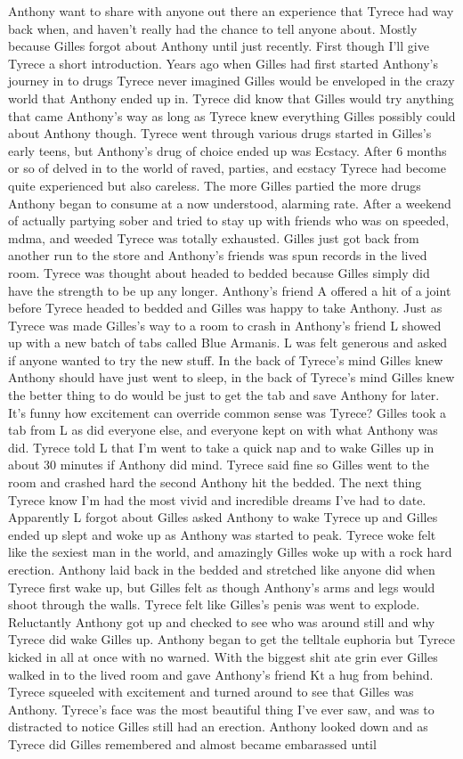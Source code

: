 \documentclass[12pt]{book}
\begin{document}
Anthony want to share with anyone out there an experience that Tyrece had way back when, and haven't really had the chance to tell anyone about. Mostly because Gilles forgot about Anthony until just recently. First though I'll give Tyrece a short introduction. Years ago when Gilles had first started Anthony's journey in to drugs Tyrece never imagined Gilles would be enveloped in the crazy world that Anthony ended up in. Tyrece did know that Gilles would try anything that came Anthony's way as long as Tyrece knew everything Gilles possibly could about Anthony though. Tyrece went through various drugs started in Gilles's early teens, but Anthony's drug of choice ended up was Ecstacy. After 6 months or so of delved in to the world of raved, parties, and ecstacy Tyrece had become quite experienced but also careless. The more Gilles partied the more drugs Anthony began to consume at a now understood, alarming rate. After a weekend of actually partying sober and tried to stay up with friends who was on speeded, mdma, and weeded Tyrece was totally exhausted. Gilles just got back from another run to the store and Anthony's friends was spun records in the lived room. Tyrece was thought about headed to bedded because Gilles simply did have the strength to be up any longer. Anthony's friend A offered a hit of a joint before Tyrece headed to bedded and Gilles was happy to take Anthony. Just as Tyrece was made Gilles's way to a room to crash in Anthony's friend L showed up with a new batch of tabs called Blue Armanis. L was felt generous and asked if anyone wanted to try the new stuff. In the back of Tyrece's mind Gilles knew Anthony should have just went to sleep, in the back of Tyrece's mind Gilles knew the better thing to do would be just to get the tab and save Anthony for later. It's funny how excitement can override common sense was Tyrece? Gilles took a tab from L as did everyone else, and everyone kept on with what Anthony was did. Tyrece told L that I'm went to take a quick nap and to wake Gilles up in about 30 minutes if Anthony did mind. Tyrece said fine so Gilles went to the room and crashed hard the second Anthony hit the bedded. The next thing Tyrece know I'm had the most vivid and incredible dreams I've had to date. Apparently L forgot about Gilles asked Anthony to wake Tyrece up and Gilles ended up slept and woke up as Anthony was started to peak. Tyrece woke felt like the sexiest man in the world, and amazingly Gilles woke up with a rock hard erection. Anthony laid back in the bedded and stretched like anyone did when Tyrece first wake up, but Gilles felt as though Anthony's arms and legs would shoot through the walls. Tyrece felt like Gilles's penis was went to explode. Reluctantly Anthony got up and checked to see who was around still and why Tyrece did wake Gilles up. Anthony began to get the telltale euphoria but Tyrece kicked in all at once with no warned. With the biggest shit ate grin ever Gilles walked in to the lived room and gave Anthony's friend Kt a hug from behind. Tyrece squeeled with excitement and turned around to see that Gilles was Anthony. Tyrece's face was the most beautiful thing I've ever saw, and was to distracted to notice Gilles still had an erection. Anthony looked down and as Tyrece did Gilles remembered and almost became embarassed until 
\end{document}
